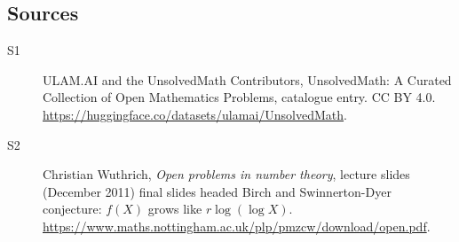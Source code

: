 \documentclass[11pt]{article}
\begin{document}
\subsection{Sources}
\begin{description}
\item[\hypertarget{source:statement:1}{S1}] ULAM.AI and the UnsolvedMath Contributors, UnsolvedMath: A Curated Collection of Open Mathematics Problems, catalogue entry. CC BY 4.0. \url{https://huggingface.co/datasets/ulamai/UnsolvedMath}.
\item[\hypertarget{source:statement:2}{S2}] Christian Wuthrich, \emph{Open problems in number theory}, lecture slides (December 2011) final slides headed Birch and Swinnerton-Dyer conjecture: $f(X)$ grows like $r\log(\log X)$. \url{https://www.maths.nottingham.ac.uk/plp/pmzcw/download/open.pdf}.
\end{description}
\label{end:statement}
\end{document}
